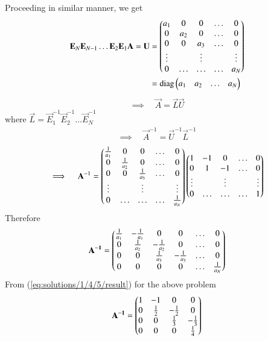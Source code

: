 Proceeding in similar manner, we get
\begin{align}
	\mathbf{E}_N\mathbf{E}_{N-1}\ldots\mathbf{E}_2\mathbf{E}_1\mathbf{A} = \mathbf{U} 
	&= 
	\begin{pmatrix} a_1 & 0 & 0 & \ldots & 0 \\
		0 & a_2 & 0 & \ldots & 0 \\
		0 & 0   & a_3 & \ldots & 0 \\
		\vdots & & \vdots &  & \vdots  \\
		    0 & \ldots & \ldots & \ldots & a_N \end{pmatrix} \\
	&= \text{diag} \begin{pmatrix}a_1 & a_2 & \ldots & a_N\end{pmatrix}
\end{align}
\begin{align}
	\implies \quad \vec{A} = \vec{L} \vec{U} 
\end{align}
	where \quad 
	$\vec{L} = \vec{E}_1^{-1} \vec{E}_2^{-1} \ldots \vec{E}_N^{-1}$ 
\begin{align}
	\implies \quad \vec{A}^{-1}  = \vec{U}^{-1} \vec{L}^{-1} 
\end{align}
\begin{align}
	\implies \quad \mathbf{A}^{-1}  
	= 
	\begin{pmatrix} \frac{1}{a_1} & 0 & 0 & \ldots & 0 \\
		0 & \frac{1}{a_2} & 0 & \ldots & 0 \\
		0 & 0   & \frac{1}{a_3} & \ldots & 0 \\
		\vdots & & \vdots &  & \vdots  \\
		    0 & \ldots & \ldots & \ldots & \frac{1}{a_N} \end{pmatrix}
	 \begin{pmatrix}1 & -1 & 0 & \ldots & 0 \\
			    0 & 1 &-1 & \ldots & 0 \\
			  \vdots & & \vdots &  & \vdots  \\
			    0 & \ldots & \ldots & \ldots & 1 \end{pmatrix}
\end{align}
Therefore
\begin{align}
	\mathbf{A^{-1}} = \begin{pmatrix}\frac{1}{a_1} &-\frac{1}{a_1} & 0 & 0&\ldots &0 \\
			0 & \frac{1}{a_2} & -\frac{1}{a_2} & 0 & \ldots &0 \\
			0 & 0 & \frac{1}{a_3} & -\frac{1}{a_3} & \ldots &0\\
			0 & 0 & 0 & 0 & \ldots & \frac{1}{a_N}\end{pmatrix} \label{eq:solutions/1/4/5/result}
\end{align}
From (\ref{eq:solutions/1/4/5/result}) for the above problem 
\begin{align}
        \mathbf{A^{-1}} = \begin{pmatrix} 1 & -1 & 0 & 0 \\
                        0 & \frac{1}{2} & -\frac{1}{2} & 0 \\
                        0 & 0 & \frac{1}{3} & -\frac{1}{3} \\
                        0 & 0 & 0 & \frac{1}{4}\end{pmatrix}
\end{align}


